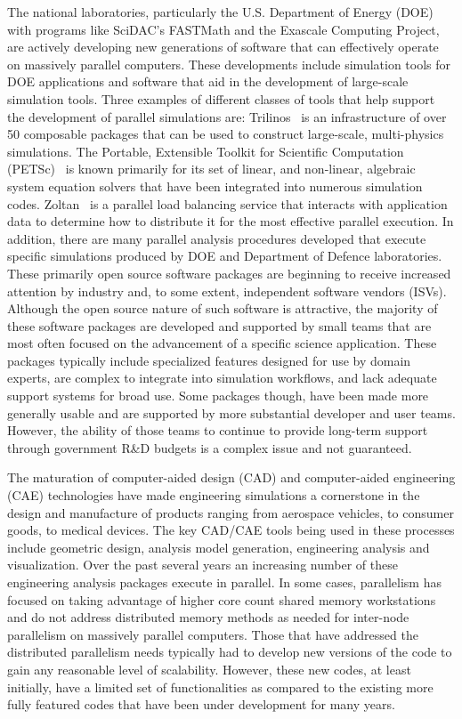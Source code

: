 The national laboratories, particularly the U.S. Department of Energy (DOE) with
programs like SciDAC's FASTMath and the Exascale Computing Project, are actively
developing new generations of software that can effectively operate on massively
parallel computers.
These developments include simulation tools for DOE applications and
software that aid in the development of large-scale simulation tools.
Three examples of different classes of tools that help support the development of
parallel simulations are:
Trilinos~\cite{TrilinosOverview} is an infrastructure of over 50 composable
packages that can be used to construct large-scale, multi-physics
simulations.
The Portable, Extensible Toolkit for Scientific Computation
(PETSc)~\cite{petsc-web-page} is known primarily for its set of linear, and
non-linear, algebraic system equation solvers that have been integrated into
numerous simulation codes.
Zoltan~\cite{devine2002zoltan} is a parallel load balancing service
that interacts with application data to determine how to distribute it for the
most effective parallel execution.
In addition, there are many parallel analysis procedures developed
that execute specific simulations produced by DOE and Department of Defence
laboratories.
These primarily open source software packages are beginning to receive increased
attention by industry and, to some extent, independent software vendors (ISVs).
Although the open source nature of such software is attractive, the majority of
these software packages are developed and supported by small teams that are most
often focused on the advancement of a specific science application.
These packages typically include specialized features designed for use by
domain experts, are complex to integrate into simulation workflows, and lack
adequate support systems for broad use.
Some packages though, have been made more generally usable and are
supported by more substantial developer and user teams.
However, the ability of those teams to continue to provide long-term support
through government R\&D budgets is a complex issue and not guaranteed.

The maturation of computer-aided design (CAD) and computer-aided engineering (CAE)
technologies have made engineering simulations
a cornerstone in the design and manufacture of products ranging from aerospace
vehicles, to consumer goods, to medical devices.
The key CAD/CAE tools being used in these processes include geometric design,
analysis model generation, engineering analysis and visualization.
Over the past several years an increasing number of these engineering analysis
packages execute in parallel.
In some cases, parallelism has focused on taking advantage of higher core count
shared memory workstations and do not address distributed memory methods as
needed for inter-node parallelism on massively parallel computers.
Those that have addressed the distributed parallelism needs typically had to
develop new versions of the code to gain any reasonable level of scalability.
However, these new codes, at least initially, have a limited set of
functionalities as compared to the existing more fully featured codes that have
been under development for many years.

